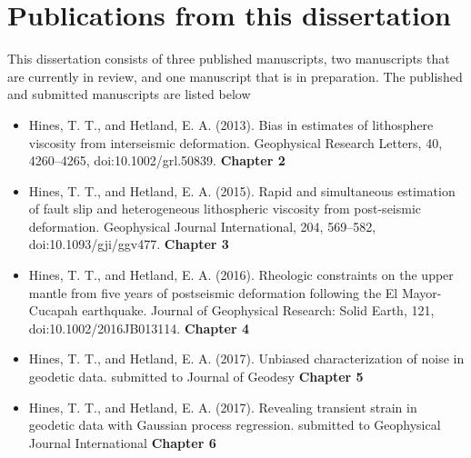 \section{Publications from this dissertation}
This dissertation consists of three published manuscripts, two manuscripts that are currently in review, and one manuscript that is in preparation. The published and submitted manuscripts are listed below
\begin{itemize}
\item{Hines, T. T., and Hetland, E. A. (2013). Bias in estimates of lithosphere viscosity from interseismic deformation. Geophysical Research Letters, 40, 4260--4265, doi:10.1002/grl.50839. \textbf{Chapter 2}}  
\item{Hines, T. T., and Hetland, E. A. (2015). Rapid and simultaneous estimation of fault slip and heterogeneous lithospheric viscosity from post-seismic deformation. Geophysical Journal International, 204, 569–582, doi:10.1093/gji/ggv477. \textbf{Chapter 3}} 
\item{Hines, T. T., and Hetland, E. A. (2016). Rheologic constraints on the upper mantle from five years of postseismic deformation following the El Mayor-Cucapah earthquake. Journal of Geophysical Research: Solid Earth, 121, doi:10.1002/2016JB013114. \textbf{Chapter 4}}
\item{Hines, T. T., and Hetland, E. A. (2017). Unbiased characterization of noise in geodetic data. submitted to Journal of Geodesy \textbf{Chapter 5}}
\item{Hines, T. T., and Hetland, E. A. (2017). Revealing transient strain in geodetic data with Gaussian process regression. submitted to Geophysical Journal International \textbf{Chapter 6}} 
\end{itemize}